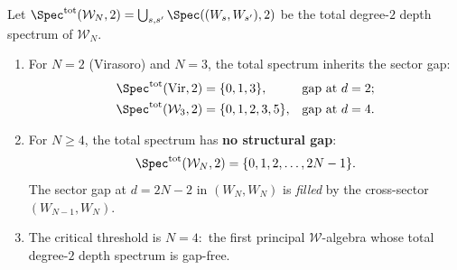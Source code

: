 \begin{theorem}
\label{thm:cross-sector-filling}
%
%
Let $\Spec^{\mathrm{tot}}(\mathcal{W}_N, 2)
= \bigcup_{s, s'} \Spec((W_s, W_{s'}), 2)$ be the
total degree-$2$ depth spectrum of $\mathcal{W}_N$.
\begin{enumerate}[label=\textup{(\roman*)}]
\item For $N = 2$ \textup{(Virasoro)} and $N = 3$,
 the total spectrum inherits the sector gap:
 \begin{align}
 \Spec^{\mathrm{tot}}(\mathrm{Vir}, 2) &= \{0, 1, 3\},
 & \text{gap at } d = 2; \\
 \Spec^{\mathrm{tot}}(\mathcal{W}_3, 2) &= \{0, 1, 2, 3, 5\},
 & \text{gap at } d = 4.
 \end{align}
\item For $N \ge 4$, the total spectrum has
 \textbf{no structural gap}:
 \begin{equation}
 \Spec^{\mathrm{tot}}(\mathcal{W}_N, 2)
 = \{0, 1, 2, \ldots, 2N - 1\}.
 \end{equation}
 The sector gap at $d = 2N - 2$ in $(W_N, W_N)$ is
 \emph{filled} by the cross-sector $(W_{N-1}, W_N)$.
\item The critical threshold is $N = 4$:\ the first
 principal $\mathcal{W}$-algebra whose total degree-$2$
 depth spectrum is gap-free.
\end{enumerate}
\end{theorem}

